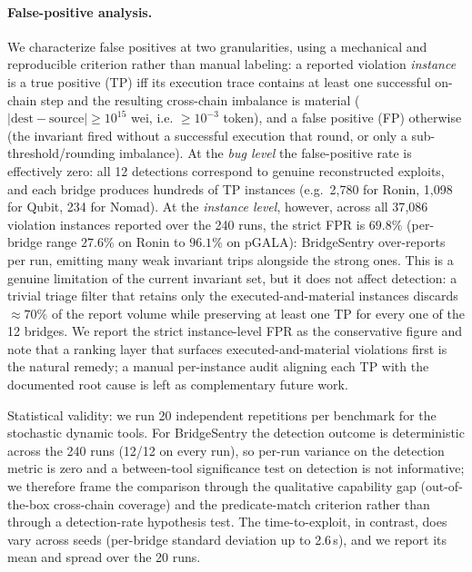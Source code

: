 \documentclass[journal]{IEEEtran}
\begin{document}
\paragraph{False-positive analysis.}
We characterize false positives at two granularities, using a mechanical and reproducible criterion rather than manual labeling: a reported violation \emph{instance} is a true positive (TP) iff its execution trace contains at least one successful on-chain step and the resulting cross-chain imbalance is material ($|\text{dest}-\text{source}| \ge 10^{15}$ wei, i.e. $\ge 10^{-3}$ token), and a false positive (FP) otherwise (the invariant fired without a successful execution that round, or only a sub-threshold/rounding imbalance). At the \emph{bug level} the false-positive rate is effectively zero: all 12 detections correspond to genuine reconstructed exploits, and each bridge produces hundreds of TP instances (e.g.\ 2{,}780 for Ronin, 1{,}098 for Qubit, 234 for Nomad). At the \emph{instance level}, however, across all 37{,}086 violation instances reported over the 240 runs, the strict FPR is $69.8\%$ (per-bridge range $27.6\%$ on Ronin to $96.1\%$ on pGALA): BridgeSentry over-reports per run, emitting many weak invariant trips alongside the strong ones. This is a genuine limitation of the current invariant set, but it does not affect detection: a trivial triage filter that retains only the executed-and-material instances discards $\approx70\%$ of the report volume while preserving at least one TP for every one of the 12 bridges. We report the strict instance-level FPR as the conservative figure and note that a ranking layer that surfaces executed-and-material violations first is the natural remedy; a manual per-instance audit aligning each TP with the documented root cause is left as complementary future work.

Statistical validity: we run 20 independent repetitions per benchmark for the stochastic dynamic tools. For BridgeSentry the detection outcome is deterministic across the 240 runs (12/12 on every run), so per-run variance on the detection metric is zero and a between-tool significance test on detection is not informative; we therefore frame the comparison through the qualitative capability gap (out-of-the-box cross-chain coverage) and the predicate-match criterion rather than through a detection-rate hypothesis test. The time-to-exploit, in contrast, does vary across seeds (per-bridge standard deviation up to 2.6\,s), and we report its mean and spread over the 20 runs. %
\end{document}
